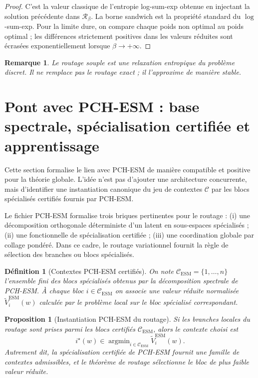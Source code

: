 \documentclass[11pt,a4paper]{article}
\newtheorem{definition}{Définition}[section]
\newtheorem{proposition}{Proposition}[section]
\newtheorem{remark}{Remarque}[section]
\DeclareMathOperator{\argmin}{argmin}
\newcommand{\Ccal}{\mathcal C}
\newcommand{\Rcal}{\mathcal R}
\begin{document}
\begin{proof}
C'est la valeur classique de l'entropie log-sum-exp obtenue en injectant la solution précédente dans \(\Rcal_\beta\). La borne sandwich est la propriété standard du \(\log\)-sum-exp. Pour la limite dure, on compare chaque poids non optimal au poids optimal ; les différences strictement positives dans les valeurs réduites sont écrasées exponentiellement lorsque \(\beta\to+\infty\).
\end{proof}

\begin{remark}
Le routage souple est une relaxation entropique du problème discret. Il ne remplace pas le routage exact ; il l'approxime de manière stable.
\end{remark}

\section{Pont avec PCH-ESM : base spectrale, spécialisation certifiée et apprentissage}

Cette section formalise le lien avec PCH-ESM de manière compatible et positive pour la théorie globale. L'idée n'est pas d'ajouter une architecture concurrente, mais d'identifier une instantiation canonique du jeu de contextes \(\Ccal\) par les blocs spécialisés certifiés fournis par PCH-ESM.

Le fichier PCH-ESM formalise trois briques pertinentes pour le routage :
(i) une décomposition orthogonale déterministe d'un latent en sous-espaces spécialisés ;
(ii) une fonctionnelle de spécialisation certifiée ;
(iii) une coordination globale par collage pondéré.
Dans ce cadre, le routage variationnel fournit la règle de sélection des branches ou blocs spécialisés.

\begin{definition}[Contextes PCH-ESM certifiés]
On note \(\Ccal_{\mathrm{ESM}}=\{1,\dots,n\}\) l'ensemble fini des blocs spécialisés obtenus par la décomposition spectrale de PCH-ESM. À chaque bloc \(i\in\Ccal_{\mathrm{ESM}}\) on associe une valeur réduite normalisée \(\widetilde V_i^{\mathrm{ESM}}(w)\) calculée par le problème local sur le bloc spécialisé correspondant.
\end{definition}

\begin{proposition}[Instantiation PCH-ESM du routage]
Si les branches locales du routage sont prises parmi les blocs certifiés \(\Ccal_{\mathrm{ESM}}\), alors le contexte choisi est
\[
i^\star(w)\in\argmin_{i\in\Ccal_{\mathrm{ESM}}}\widetilde V_i^{\mathrm{ESM}}(w).
\]
Autrement dit, la spécialisation certifiée de PCH-ESM fournit une famille de contextes admissibles, et le théorème de routage sélectionne le bloc de plus faible valeur réduite.
\end{proposition}
\end{document}
